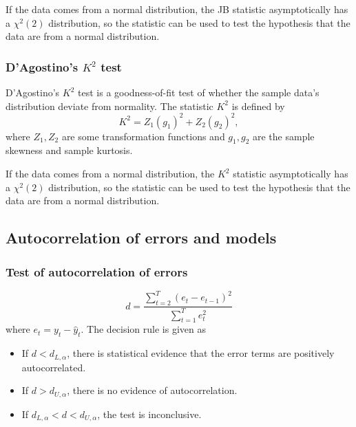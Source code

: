 \begin{refsection}
\begin{remark}
If the data comes from a normal distribution, the JB statistic asymptotically has a $\chi^2(2)$ distribution, so the statistic can be used to test the hypothesis that the data are from a normal distribution.
\end{remark}


\subsubsection{D'Agostino's $K^2$ test}

\begin{definition}
D'Agostino's $K^2$ test is a goodness-of-fit test of whether the sample data's distribution deviate from normality. The statistic $K^2$ is defined by
$$K^2 = Z_1(g_1)^2 + Z_2(g_2)^2,$$
where $Z_1, Z_2$ are some transformation functions and $g_1, g_2$ are the sample skewness and sample kurtosis.	
\end{definition}

\begin{remark}
	If the data comes from a normal distribution, the $K^2$ statistic asymptotically has a $\chi^2(2)$ distribution, so the statistic can be used to test the hypothesis that the data are from a normal distribution.
\end{remark}



\subsection{Autocorrelation of errors and models}
\subsubsection{Test of autocorrelation of errors}
\begin{definition}
	$$d = \frac{\sum_{t=2}^T (e_t - e_{t-1})^2}{\sum_{t=1}^T e_t^2}$$
	where $e_t = y_t - \hat{y}_t$.
	The decision rule is given as
	\begin{itemize}
		\item 	If $d < d_{L,\alpha}$, there is statistical evidence that the error terms are positively autocorrelated.
		\item 	If $d > d_{U,\alpha}$, there is no evidence of autocorrelation.
		\item 	If $d_{L,\alpha} < d < d_{U,\alpha}$, the test is inconclusive.
	\end{itemize}
\end{definition}


\end{refsection}
